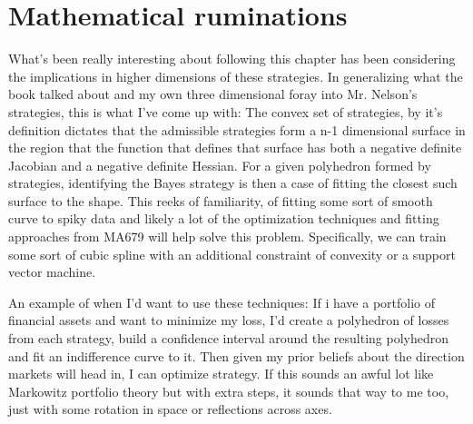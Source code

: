\documentclass{article}
\begin{document}
\section{Mathematical ruminations}
What's been really interesting about following this chapter has been considering the implications in higher dimensions of these strategies. In generalizing what the book talked about and my own three dimensional foray into Mr. Nelson's strategies, this is what I've come up with: The convex set of strategies, by it's definition dictates that the admissible strategies form a n-1 dimensional surface in the region that the function that defines that surface has both a negative definite Jacobian and a negative definite Hessian. For a given polyhedron formed by strategies, identifying the Bayes strategy is then a case of fitting the closest such surface to the shape. This reeks of familiarity, of fitting some sort of smooth curve to spiky data and likely a lot of the optimization techniques and fitting approaches from MA679 will help solve this problem. Specifically, we can train some sort of cubic spline with an additional constraint of convexity or a support vector machine. 

\vspace{5mm} %
An example of when I'd want to use these techniques:
If i have a portfolio of financial assets and want to minimize my loss, I'd create a polyhedron of losses from each strategy, build a confidence interval around the resulting polyhedron and fit an indifference curve to it. Then given my prior beliefs about the direction markets will head in, I can optimize strategy. If this sounds an awful lot like Markowitz portfolio theory but with extra steps, it sounds that way to me too, just with some rotation in space or reflections across axes. 
\end{document}
